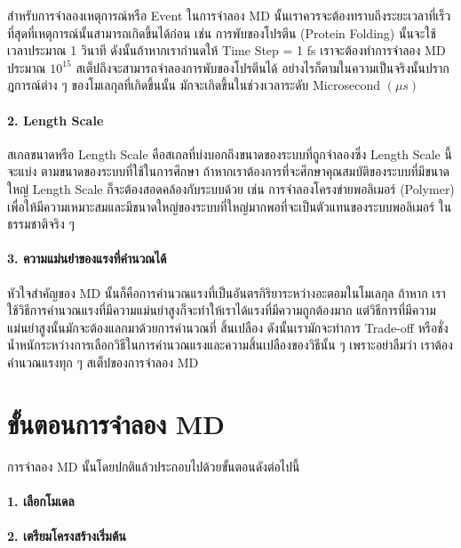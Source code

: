สำหรับการจำลองเหตุการณ์หรือ Event ในการจำลอง MD นั้นเราควรจะต้องทราบถึงระยะเวลาที่เร็วที่สุดที่เหตุการณ์นั้นสามารถเกิดขึ้นได้ก่อน เช่น
การพับของโปรตีน (Protein Folding) นั้นจะใช้เวลาประมาณ 1 วินาที ดังนั้นถ้าหากเรากำนดให้ Time Step = 1 fs เราจะต้องทำการจำลอง
MD ประมาณ $10^{15}$ สเต็ปถึงจะสามารถจำลองการพับของโปรตีนได้ อย่างไรก็ตามในความเป็นจริงนั้นปรากฎการณ์ต่าง ๆ ของโมเลกุลที่เกิดขึ้นนั้น%
มักจะเกิดขึ้นในช่วงเวลาระดับ Microsecond $(\mu s)$

\paragraph{2. Length Scale} สเกลขนาดหรือ Length Scale คือสเกลที่บ่งบอกถึงขนาดของระบบที่ถูกจำลองซึ่ง Length Scale นี้จะแบ่ง%
ตามขนาดของระบบที่ใช้ในการศึกษา ถ้าหากเราต้องการที่จะศึกษาคุณสมบัติของระบบที่มีขนาดใหญ่ Length Scale ก็จะต้องสอดคล้องกับระบบด้วย
เช่น การจำลองโครงข่ายพอลิเมอร์ (Polymer) เพื่อให้มีความเหมาะสมและมีขนาดใหญ่ของระบบที่ใหญ่มากพอที่จะเป็นตัวแทนของระบบพอลิเมอร์%
ในธรรมชาติจริง ๆ

\paragraph{3. ความแม่นยำของแรงที่คำนวณได้} หัวใจสำคัญของ MD นั้นก็คือการคำนวณแรงที่เป็นอันตรกิริยาระหว่างอะตอมในโมเลกุล ถ้าหาก%
เราใช้วิธีการคำนวณแรงที่มีความแม่นยำสูงก็จะทำให้เราได้แรงที่มีความถูกต้องมาก แต่วิธีการที่มีความแม่นยำสูงนั้นมักจะต้องแลกมาด้วยการคำนวณที่%
สิ้นเปลือง ดังนั้นเรามักจะทำการ Trade-off หรือชั่งน้ำหนักระหว่างการเลือกวิธีในการคำนวณแรงและความสิ้นเปลืองของวิธีนั้น ๆ เพราะอย่าลืมว่า%
เราต้องคำนวณแรงทุก ๆ สเต็ปของการจำลอง MD

\section{ขั้นตอนการจำลอง MD}

การจำลอง MD นั้นโดยปกติแล้วประกอบไปด้วยขั้นตอนดังต่อไปนี้

\paragraph{1. เลือกโมเดล}

\paragraph{2. เตรียมโครงสร้างเริ่มต้น}

